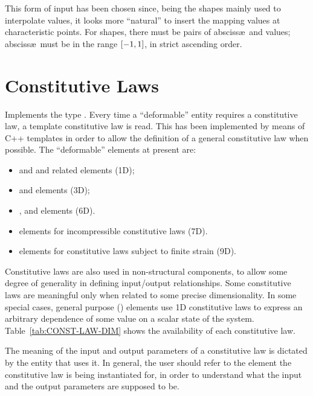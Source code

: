 This form of input has been chosen since, being the shapes mainly used to
interpolate values, it looks more ``natural'' to insert the mapping values
at characteristic points.
For  shapes, there must be 
 pairs of absciss\ae\ and values; absciss\ae\
must be in the range $\left[ -1,1 \right]$, in strict ascending order.


\section{Constitutive Laws}\label{sec:ConstitutiveLaw}
Implements the type \texttt{}.
Every time a ``deformable'' entity requires a constitutive law, a template
constitutive law is read. This has been implemented by means of C++
templates in order to allow the definition of a general constitutive law
when possible.
The ``deformable'' elements at present are:
\begin{itemize}
\item {}
	and
	and related elements (1D);
\item {}
	and 
	elements (3D);
\item {},  and 
        elements (6D).
\item {}
  elements for incompressible constitutive laws (7D).
\item \htmlref{\kw{solid}}{sec:EL:SOLID}
	elements for constitutive laws subject to finite strain (9D).
\end{itemize}

Constitutive laws are also used in non-structural components,
to allow some degree of generality in defining input/output relationships.
Some constitutive laws are meaningful only when related to some precise
dimensionality. 
In some special cases, general purpose ()
elements use 1D constitutive laws to express an arbitrary dependence
of some value on a scalar state of the system.
Table~\ref{tab:CONST-LAW-DIM} shows the availability of each constitutive law.

The meaning of the input and output parameters of a constitutive law
is dictated by the entity that uses it.
In general, the user should refer to the element the constitutive law
is being instantiated for, in order to understand what the input
and the output parameters are supposed to be.

